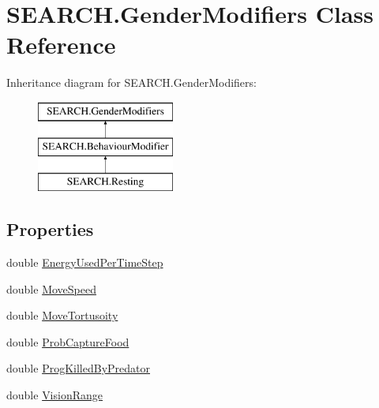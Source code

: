 \hypertarget{class_s_e_a_r_c_h_1_1_gender_modifiers}{\section{S\-E\-A\-R\-C\-H.\-Gender\-Modifiers Class Reference}
\label{class_s_e_a_r_c_h_1_1_gender_modifiers}
}
Inheritance diagram for S\-E\-A\-R\-C\-H.\-Gender\-Modifiers\-:\begin{figure}[H]
\begin{center}
\leavevmode
\includegraphics[height=3.000000cm]{class_s_e_a_r_c_h_1_1_gender_modifiers}
\end{center}
\end{figure}
\subsection*{Properties}
\begin{DoxyCompactItemize}
\item 
double \hyperlink{class_s_e_a_r_c_h_1_1_gender_modifiers_a3428fc5be65c38c82cace4ac6ada0587}{Energy\-Used\-Per\-Time\-Step}
\item 
double \hyperlink{class_s_e_a_r_c_h_1_1_gender_modifiers_adcae5f50fbd812660e119a93d1ae3302}{Move\-Speed}
\item 
double \hyperlink{class_s_e_a_r_c_h_1_1_gender_modifiers_ab69d24d382bb36907d2f97fb2e4ce107}{Move\-Tortusoity}
\item 
double \hyperlink{class_s_e_a_r_c_h_1_1_gender_modifiers_a06d62545bc956483f667edc8352d6884}{Prob\-Capture\-Food}
\item 
double \hyperlink{class_s_e_a_r_c_h_1_1_gender_modifiers_ad3932ec592e9eaeac8266375122ff312}{Prog\-Killed\-By\-Predator}
\item 
double \hyperlink{class_s_e_a_r_c_h_1_1_gender_modifiers_aef2492f6721cb65c462a84d981331ec5}{Vision\-Range}
\end{DoxyCompactItemize}


